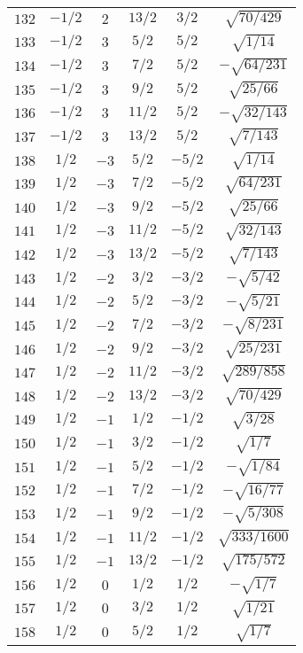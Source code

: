 \begin{table}
\begin{center}
\begin{tabular}{|c|c|c|c|c|c|}
$132$ & $-1/2$ & $2$ & $13/2$ & $3/2$ & $\sqrt{70/429}$ \\ 
$133$ & $-1/2$ & $3$ & $5/2$ & $5/2$ & $\sqrt{1/14}$ \\ 
$134$ & $-1/2$ & $3$ & $7/2$ & $5/2$ & $-\sqrt{64/231}$ \\ 
$135$ & $-1/2$ & $3$ & $9/2$ & $5/2$ & $\sqrt{25/66}$ \\ 
$136$ & $-1/2$ & $3$ & $11/2$ & $5/2$ & $-\sqrt{32/143}$ \\ 
$137$ & $-1/2$ & $3$ & $13/2$ & $5/2$ & $\sqrt{7/143}$ \\ 
$138$ & $1/2$ & $-3$ & $5/2$ & $-5/2$ & $\sqrt{1/14}$ \\ 
$139$ & $1/2$ & $-3$ & $7/2$ & $-5/2$ & $\sqrt{64/231}$ \\ 
$140$ & $1/2$ & $-3$ & $9/2$ & $-5/2$ & $\sqrt{25/66}$ \\ 
$141$ & $1/2$ & $-3$ & $11/2$ & $-5/2$ & $\sqrt{32/143}$ \\ 
$142$ & $1/2$ & $-3$ & $13/2$ & $-5/2$ & $\sqrt{7/143}$ \\ 
$143$ & $1/2$ & $-2$ & $3/2$ & $-3/2$ & $-\sqrt{5/42}$ \\ 
$144$ & $1/2$ & $-2$ & $5/2$ & $-3/2$ & $-\sqrt{5/21}$ \\ 
$145$ & $1/2$ & $-2$ & $7/2$ & $-3/2$ & $-\sqrt{8/231}$ \\ 
$146$ & $1/2$ & $-2$ & $9/2$ & $-3/2$ & $\sqrt{25/231}$ \\ 
$147$ & $1/2$ & $-2$ & $11/2$ & $-3/2$ & $\sqrt{289/858}$ \\ 
$148$ & $1/2$ & $-2$ & $13/2$ & $-3/2$ & $\sqrt{70/429}$ \\ 
$149$ & $1/2$ & $-1$ & $1/2$ & $-1/2$ & $\sqrt{3/28}$ \\ 
$150$ & $1/2$ & $-1$ & $3/2$ & $-1/2$ & $\sqrt{1/7}$ \\ 
$151$ & $1/2$ & $-1$ & $5/2$ & $-1/2$ & $-\sqrt{1/84}$ \\ 
$152$ & $1/2$ & $-1$ & $7/2$ & $-1/2$ & $-\sqrt{16/77}$ \\ 
$153$ & $1/2$ & $-1$ & $9/2$ & $-1/2$ & $-\sqrt{5/308}$ \\ 
$154$ & $1/2$ & $-1$ & $11/2$ & $-1/2$ & $\sqrt{333/1600}$ \\ 
$155$ & $1/2$ & $-1$ & $13/2$ & $-1/2$ & $\sqrt{175/572}$ \\ 
$156$ & $1/2$ & $0$ & $1/2$ & $1/2$ & $-\sqrt{1/7}$ \\ 
$157$ & $1/2$ & $0$ & $3/2$ & $1/2$ & $\sqrt{1/21}$ \\ 
$158$ & $1/2$ & $0$ & $5/2$ & $1/2$ & $\sqrt{1/7}$ \\ 

\end{tabular}
\end{center}
\end{table}
